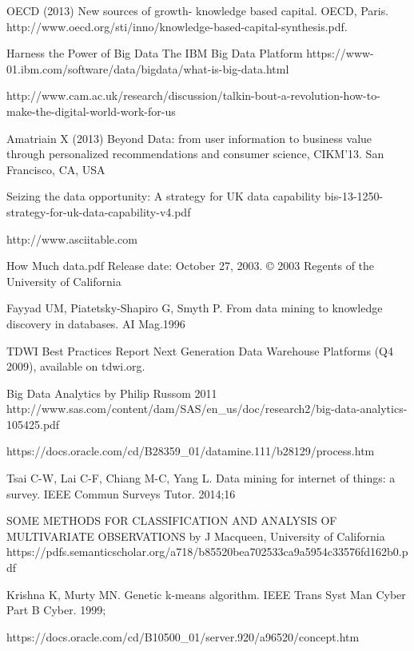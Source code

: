 \documentclass[10pt,journal,compsoc]{IEEEtran}
\begin{document}
\begin{thebibliography}{1}

OECD (2013) New sources of growth- knowledge based capital. OECD, Paris. 
http://www.oecd.org/sti/inno/knowledge-based-capital-synthesis.pdf.

Harness the Power of Big Data The IBM Big Data Platform
https://www-01.ibm.com/software/data/bigdata/what-is-big-data.html

http://www.cam.ac.uk/research/discussion/talkin-bout-a-revolution-how-to-make-the-digital-world-work-for-us

Amatriain X (2013) Beyond Data: from user information to business value through personalized recommendations
and consumer science, CIKM’13. San Francisco, CA, USA

Seizing the data opportunity: A strategy for UK data capability
bis-13-1250-strategy-for-uk-data-capability-v4.pdf

http://www.asciitable.com

How Much data.pdf
Release date: October 27, 2003. © 2003 Regents of the University of California

Fayyad UM, Piatetsky-Shapiro G, Smyth P. From data mining to knowledge discovery in databases. AI Mag.1996

TDWI Best Practices Report Next Generation Data Warehouse Platforms (Q4 2009), available on tdwi.org.

Big Data Analytics by Philip Russom 2011
http://www.sas.com/content/dam/SAS/en\_us/doc/research2/big-data-analytics-105425.pdf

https://docs.oracle.com/cd/B28359\_01/datamine.111/b28129/process.htm

Tsai C-W, Lai C-F, Chiang M-C, Yang L. Data mining for internet of things: a survey. IEEE Commun Surveys Tutor.
2014;16

SOME METHODS FOR CLASSIFICATION AND ANALYSIS OF MULTIVARIATE OBSERVATIONS by J Macqueen, University of California
https://pdfs.semanticscholar.org/a718/b85520bea702533ca9a5954c33576fd162b0.pdf

Krishna K, Murty MN. Genetic k-means algorithm. IEEE Trans Syst Man Cyber Part B Cyber. 1999;

https://docs.oracle.com/cd/B10500\_01/server.920/a96520/concept.htm


\end{thebibliography}
\end{document}
